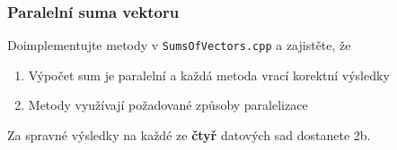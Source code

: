 \documentclass[usenames,dvipsnames,9pt]{beamer}
\begin{document}
\begin{frame}
  \frametitle{Paralelní suma vektoru}
  Doimplementujte metody v \texttt{SumsOfVectors.cpp} a zajistěte, že
  \begin{enumerate}
    \item Výpočet sum je paralelní a každá metoda vrací korektní výsledky
    \item Metody využívají požadované způsoby paralelizace
  \end{enumerate}
  
  \pause\vspace{1.5em}
  
  Za spravné výsledky na každé ze {\bf čtyř} datových sad dostanete 2b.

\end{frame}

\framefeedback{}
\end{document}
